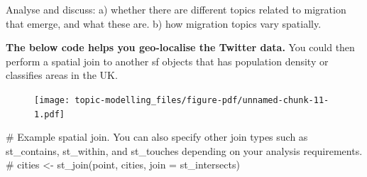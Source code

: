 \documentclass[
  letterpaper,
  DIV=11,
  numbers=noendperiod]{scrreprt}
\newenvironment{Shaded}{\begin{snugshade}}{\end{snugshade}}
\newcommand{\AttributeTok}[1]{\textcolor[rgb]{0.40,0.45,0.13}{#1}}
\newcommand{\CommentTok}[1]{\textcolor[rgb]{0.37,0.37,0.37}{#1}}
\newcommand{\DecValTok}[1]{\textcolor[rgb]{0.68,0.00,0.00}{#1}}
\newcommand{\FunctionTok}[1]{\textcolor[rgb]{0.28,0.35,0.67}{#1}}
\newcommand{\NormalTok}[1]{\textcolor[rgb]{0.00,0.23,0.31}{#1}}
\newcommand{\OtherTok}[1]{\textcolor[rgb]{0.00,0.23,0.31}{#1}}
\newcommand{\SpecialCharTok}[1]{\textcolor[rgb]{0.37,0.37,0.37}{#1}}
\newcommand{\StringTok}[1]{\textcolor[rgb]{0.13,0.47,0.30}{#1}}
\begin{document}
Analyse and discuss: a) whether there are different topics related to
migration that emerge, and what these are. b) how migration topics vary
spatially.

\textbf{The below code helps you geo-localise the Twitter data.} You
could then perform a spatial join to another sf objects that has
population density or classifies areas in the UK.

\begin{Shaded}
\end{Shaded}

\begin{figure}[H]

{\centering \texttt{[image: topic-modelling\_files/figure-pdf/unnamed-chunk-11-1.pdf]}

}

\end{figure}

\begin{Shaded}
\begin{Highlighting}[]
\CommentTok{\# Example spatial join. You can also specify other join types such as st\_contains, st\_within, and st\_touches depending on your analysis requirements.}
\CommentTok{\# cities \textless{}{-} st\_join(point, cities, join = st\_intersects)}
\end{Highlighting}
\end{Shaded}
\end{document}
